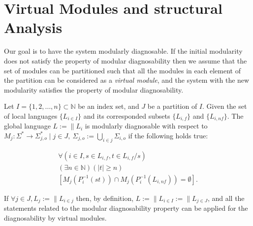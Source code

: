 \documentclass[letterpaper, 10pt, conference]{ieeeconf}
\begin{document}


\section{Virtual Modules and structural Analysis}
\label{sec:Proposal}

Our goal is to have the system modularly diagnosable. If the initial modularity
does not satisfy the property of modular diagnosability then we assume that the
set of modules can be partitioned such that all the modules in each
element of the partition can be considered as a \emph{virtual module}, and the
system with the new modularity satisfies the property of modular diagnosability.

\begin{definition} 
Let $I = \{1,2,\ldots,n\} \subset  \mathbb{N}$ be an index set, and $J$ be a
partition of $I$. Given the set of local languages $\{L_{i \in I}\}$ and its
corresponded subsets $\{L_{i,f}\}$ and $\{L_{i,nf}\}$. The global language $L :=
\parallel L_i$ is modularly diagnosable with respect to
$M_j: \Sigma^* \rightarrow \Sigma_{j,o}^* 
\mid j \in J, ~\Sigma_{j,o} :=\bigcup_{i \in j} \Sigma_{i,o}$ 
if the following holds true:
\end{definition}
\begin{equation}
\begin{array}{l}
	\forall(i \in I, s \in L_{i,f}, t \in L_{i,f}/s)
	\\
	(\exists n \in \mathbb{N})
	(|t| \geq n)
	\\
	\left[ M_j(P_i^{-1}(st)) \cap M_j(P_i^{-1}(L_{i,nf})) = \emptyset \right].
\end{array}
\end{equation}

If $\forall j \in J, L_{j} := \parallel L_{i \in j}$ then, by definition, $L :=
\parallel L_{i \in I} := \parallel L_{j \in J}$, and all the statements related
to the modular diagnosability  property can be applied for the diagnosability by
virtual modules.
\end{document}
